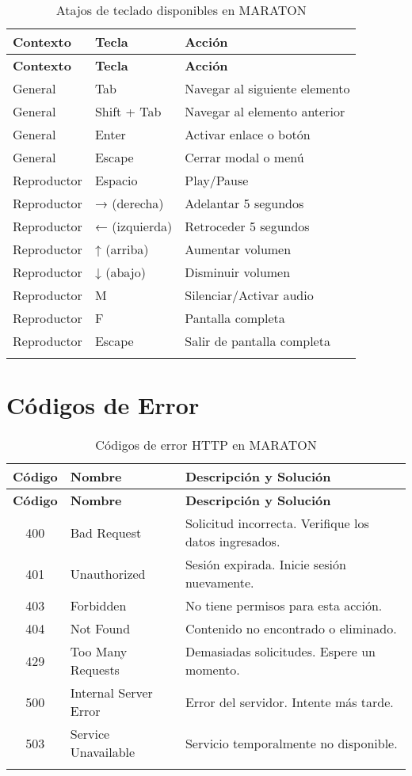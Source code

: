 \documentclass[11pt,a4paper,twoside]{book}
\begin{document}
\begin{longtable}{@{}llp{8cm}@{}}
\toprule
\textbf{Contexto} & \textbf{Tecla} & \textbf{Acción} \\ \midrule
\endfirsthead
\toprule
\textbf{Contexto} & \textbf{Tecla} & \textbf{Acción} \\ \midrule
\endhead
General & Tab & Navegar al siguiente elemento \\
General & Shift + Tab & Navegar al elemento anterior \\
General & Enter & Activar enlace o botón \\
General & Escape & Cerrar modal o menú \\
Reproductor & Espacio & Play/Pause \\
Reproductor & → (derecha) & Adelantar 5 segundos \\
Reproductor & ← (izquierda) & Retroceder 5 segundos \\
Reproductor & ↑ (arriba) & Aumentar volumen \\
Reproductor & ↓ (abajo) & Disminuir volumen \\
Reproductor & M & Silenciar/Activar audio \\
Reproductor & F & Pantalla completa \\
Reproductor & Escape & Salir de pantalla completa \\
\bottomrule
\caption{Atajos de teclado disponibles en MARATON}
\end{longtable}

\chapter{Códigos de Error}

\begin{longtable}{@{}clp{8cm}@{}}
\toprule
\textbf{Código} & \textbf{Nombre} & \textbf{Descripción y Solución} \\ \midrule
\endfirsthead
\toprule
\textbf{Código} & \textbf{Nombre} & \textbf{Descripción y Solución} \\ \midrule
\endhead
400 & Bad Request & Solicitud incorrecta. Verifique los datos ingresados. \\
401 & Unauthorized & Sesión expirada. Inicie sesión nuevamente. \\
403 & Forbidden & No tiene permisos para esta acción. \\
404 & Not Found & Contenido no encontrado o eliminado. \\
429 & Too Many Requests & Demasiadas solicitudes. Espere un momento. \\
500 & Internal Server Error & Error del servidor. Intente más tarde. \\
503 & Service Unavailable & Servicio temporalmente no disponible. \\
\bottomrule
\caption{Códigos de error HTTP en MARATON}
\end{longtable}
\end{document}
